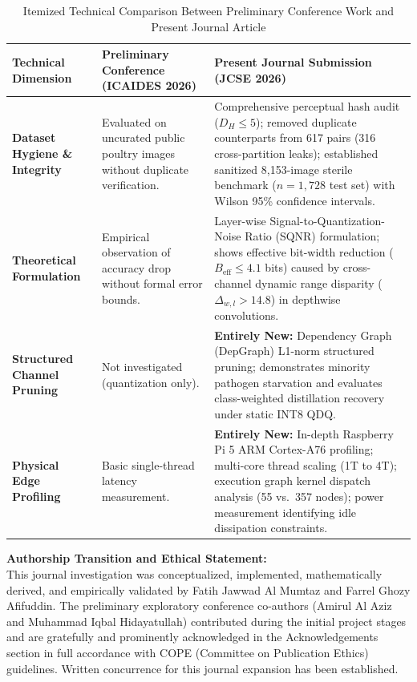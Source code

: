 \documentclass[10pt,a4paper]{article}
\begin{document}
\begin{table}[h!]
\centering
\fontsize{8pt}{9.6pt}\selectfont
\caption{Itemized Technical Comparison Between Preliminary Conference Work and Present Journal Article}
\label{tab:novelty}
\vspace{0.2em}
\begin{tabular}{p{2.6cm}p{6.4cm}p{7.4cm}}
\toprule
\textbf{Technical Dimension} & \textbf{Preliminary Conference (ICAIDES 2026)} & \textbf{Present Journal Submission (JCSE 2026)} \\
\midrule
\textbf{Dataset Hygiene \& Integrity} & Evaluated on uncurated public poultry images without duplicate verification. & Comprehensive perceptual hash audit ($D_H \le 5$); removed duplicate counterparts from 617 pairs (316 cross-partition leaks); established sanitized 8,153-image sterile benchmark ($n=1,728$ test set) with Wilson 95\% confidence intervals. \\
\addlinespace[0.2em]
\textbf{Theoretical Formulation} & Empirical observation of accuracy drop without formal error bounds. & Layer-wise Signal-to-Quantization-Noise Ratio (SQNR) formulation; shows effective bit-width reduction ($B_{\text{eff}} \le 4.1$ bits) caused by cross-channel dynamic range disparity ($\Delta_{w,l} > 14.8$) in depthwise convolutions. \\
\addlinespace[0.2em]
\textbf{Structured Channel Pruning} & Not investigated (quantization only). & \textbf{Entirely New:} Dependency Graph (DepGraph) L1-norm structured pruning; demonstrates minority pathogen starvation and evaluates class-weighted distillation recovery under static INT8 QDQ. \\
\addlinespace[0.2em]
\textbf{Physical Edge Profiling} & Basic single-thread latency measurement. & \textbf{Entirely New:} In-depth Raspberry Pi 5 ARM Cortex-A76 profiling; multi-core thread scaling (1T to 4T); execution graph kernel dispatch analysis (55 vs.\ 357 nodes); power measurement identifying idle dissipation constraints. \\
\bottomrule
\end{tabular}
\end{table}

\vspace{-0.2em}
\noindent\textbf{Authorship Transition and Ethical Statement:}\\
This journal investigation was conceptualized, implemented, mathematically derived, and empirically validated by Fatih Jawwad Al Mumtaz and Farrel Ghozy Afifuddin. The preliminary exploratory conference co-authors (Amirul Al Aziz and Muhammad Iqbal Hidayatullah) contributed during the initial project stages and are gratefully and prominently acknowledged in the Acknowledgements section in full accordance with COPE (Committee on Publication Ethics) guidelines. Written concurrence for this journal expansion has been established.
\end{document}
